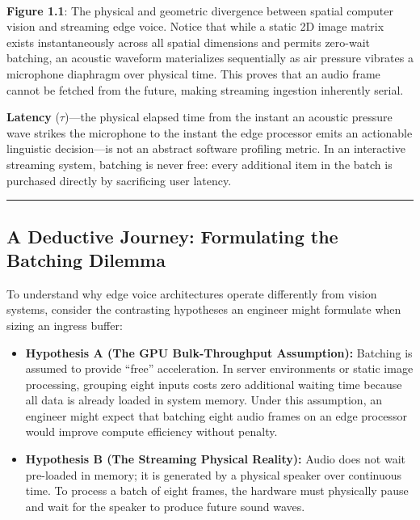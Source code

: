 \documentclass[11pt,a4paper]{article}
\renewcommand{\thefigure}{1.1\alph{figure}}
\begin{document}
\begin{center}\vspace{-2mm}
\begin{minipage}{\textwidth}
\centering
\\[2mm]
\label{fig:1_1a_cv_vs_voice}
\begin{minipage}{0.95\textwidth}
\small\textbf{Figure \thefigure}: The physical and geometric divergence between spatial computer vision and streaming edge voice. Notice that while a static 2D image matrix exists instantaneously across all spatial dimensions and permits zero-wait batching, an acoustic waveform materializes sequentially as air pressure vibrates a microphone diaphragm over physical time. This proves that an audio frame cannot be fetched from the future, making streaming ingestion inherently serial.
\end{minipage}
\end{minipage}\vspace{-2mm}
\end{center}

\textbf{Latency} ($\tau$)---the physical elapsed time from the instant an acoustic pressure wave strikes the microphone to the instant the edge processor emits an actionable linguistic decision---is not an abstract software profiling metric. In an interactive streaming system, batching is never free: every additional item in the batch is purchased directly by sacrificing user latency.

\medskip
\hrule
\medskip

\subsection*{A Deductive Journey: Formulating the Batching Dilemma}

To understand why edge voice architectures operate differently from vision systems, consider the contrasting hypotheses an engineer might formulate when sizing an ingress buffer:

\begin{itemize}\setlength{\itemsep}{2pt}\setlength{\parskip}{0pt}
    \item \textbf{Hypothesis A (The GPU Bulk-Throughput Assumption):} Batching is assumed to provide ``free'' acceleration. In server environments or static image processing, grouping eight inputs costs zero additional waiting time because all data is already loaded in system memory. Under this assumption, an engineer might expect that batching eight audio frames on an edge processor would improve compute efficiency without penalty.
    \item \textbf{Hypothesis B (The Streaming Physical Reality):} Audio does not wait pre-loaded in memory; it is generated by a physical speaker over continuous time. To process a batch of eight frames, the hardware must physically pause and wait for the speaker to produce future sound waves.
\end{itemize}
\end{document}
